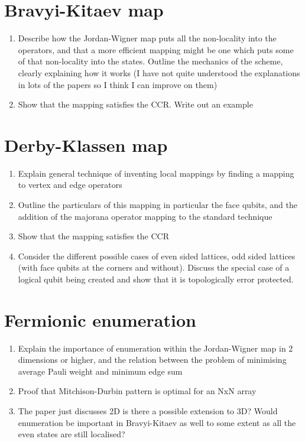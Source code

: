 \documentclass[twoside]{article}
\begin{document}
\section{Bravyi-Kitaev map}
\begin{enumerate}
        \item Describe how the Jordan-Wigner map puts all the non-locality into the operators, and that a more efficient mapping might be one which puts some of that non-locality into the states. Outline the mechanics of the scheme, clearly explaining how it works (I have not quite understood the explanations in lots of the papers so I think I can improve on them)
        \item Show that the mapping satisfies the CCR. Write out an example
\end{enumerate}
\section{Derby-Klassen map}
\begin{enumerate}
        \item Explain general technique of inventing local mappings by finding a mapping to vertex and edge operators
        \item Outline the particulars of this mapping in particular the face qubits, and the addition of the majorana operator mapping to the standard technique
        \item Show that the mapping satisfies the CCR
        \item Consider the different possible cases of even sided lattices, odd sided lattices (with face qubits at the corners and without). Discuss the special case of a logical qubit being created and show that it is topologically error protected.
\end{enumerate}
\section{Fermionic enumeration}
\begin{enumerate}
        \item Explain the importance of enumeration within the Jordan-Wigner map in 2 dimensions or higher, and the relation between the problem of minimising average Pauli weight and minimum edge sum
        \item Proof that Mitchison-Durbin pattern is optimal for an NxN array
        \item The paper just discusses 2D is there a possible extension to 3D? Would enumeration be important in Bravyi-Kitaev as well to some extent as all the even states are still localised? 
\end{enumerate}
\end{document}
